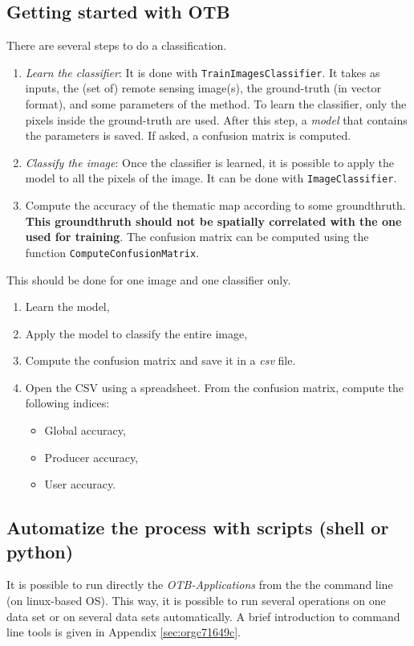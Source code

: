 \documentclass[a4paper,11pt,DIV=18]{scrartcl}
\begin{document}
\subsection{Getting started with OTB}
\label{sec:org575edde}
There are several steps to do a classification.
\begin{enumerate}
\item \emph{Learn   the    classifier}:   It    is   done    with
\texttt{TrainImagesClassifier}.   It takes  as inputs,  the (set  of) remote
sensing  image(s), the  ground-truth (in  vector format),  and some
parameters of the method.  To learn the classifier, only the pixels
inside the  ground-truth are  used. After this  step, a  \emph{model} that
contains the parameters  is saved. If asked, a  confusion matrix is
computed.
\item \emph{Classify the image}: Once the  classifier is learned, it is possible
to apply the model to all the  pixels of the image.  It can be done
with \texttt{ImageClassifier}.
\item Compute the  accuracy of  the  thematic map  according to  some
groundthruth. \textbf{This groundthruth should  not be spatially correlated
with  the one  used  for  training}.  The  confusion  matrix can  be
computed using the function \texttt{ComputeConfusionMatrix}.
\end{enumerate}


\begin{work}
This should be done for one image and one classifier only.
\begin{enumerate}
\item Learn the model,
\item Apply the model to classify the entire image,
\item Compute the confusion matrix and save it in a \emph{csv} file.
\item Open  the CSV  using a spreadsheet.   From the  confusion matrix,
compute the following indices:
\begin{itemize}
\item Global accuracy,
\item Producer accuracy,
\item User accuracy.
\end{itemize}
\end{enumerate}
\end{work}

\subsection{Automatize the process with scripts (shell or python)}
\label{sec:orgb952c82}
It  is possible  to run  directly  the \emph{OTB-Applications}  from the  the
command line  (on linux-based  OS). This  way, it  is possible  to run
several  operations  on   one  data  set  or  on   several  data  sets
automatically.  A brief introduction to command line tools is given in
Appendix \ref{sec:orgc71649c}.
\end{document}
